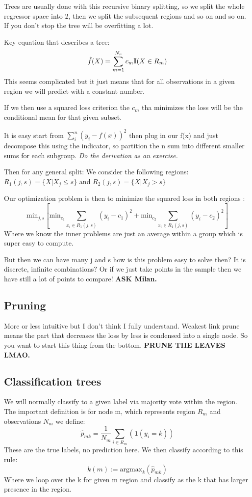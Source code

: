 \documentclass{article}
\begin{document}
Trees are usually done with this recursive binary splitting, so we split the whole regressor space into 2, then we split the subsequent regions and so on and so on. If you don't stop the tree will be overfitting a lot.

Key equation that describes a tree: 
$$\hat{f}(X) = \sum_{m=1}^{N_r} c_m \textrm{\textbf{I}}(X \in R_m)$$
This seems complicated but it just means that for all observations in a given region we will predict with a constant number.

If we then use a squared loss criterion the $c_m$ tha minimizes the loss will be the conditional mean for that given subset.

It is easy start from $\sum_i^n(y_i -f(x))^2$ then plug in our f(x) and just decompose this using the indicator, so partition the n sum into different smaller sums for each subgroup.
\textit{Do the derivation as an exercise.}

Then for any general split:
We consider the following regions: $R_1(j,s) = \{ X| X_j \leq s \}$ and $R_2(j,s) = \{ X| X_j > s \}$

Our optimization problem is then to minimize the squared loss in both regions : 
$$ \textrm{min}_{j,s}[\textrm{min}_{c_1} \sum_{x_i \in R_1(j,s)}(y_i-c_1)^2 + \textrm{min}_{c_2} \sum_{x_i \in R_1(j,s)}(y_i-c_2)^2  ]$$
Where we know the inner problems are just an average within a group which is super easy to compute.

But then we can have many j and s how is this problem easy to solve then? It is discrete, infinite combinations? Or if we just take points in the sample then we have still a lot of points to compare! \textbf{ASK Milan.}

\subsection*{Pruning}
More or less intuitive but I don't think I fully understand. Weakest link prune means the part that decreases the loss by less is condensed into a single node. So you want to start this thing from the bottom. \textbf{PRUNE THE LEAVES LMAO.}

\subsection*{Classification trees}
We will normally classify to a given label via majority vote within the region.
The important definition is for node m, which represents region $R_m$ and observations $N_m$ we define: 
$$\hat{p}_{mk} = \frac{1}{N_m}\sum_{i \in R_m}(\textbf{1}(y_i = k))$$
These are the true labels, no prediction here.
We then classify according to this rule: $$k(m) := \textrm{argmax}_{k} (\hat{p}_{mk})$$
Where we loop over the k for given m region and classify as the k that has larger presence in the region.
\end{document}
